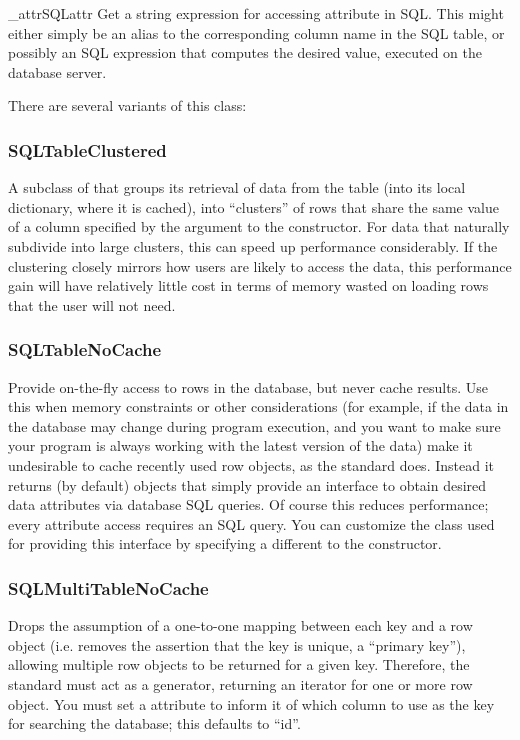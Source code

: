 \documentclass{howto}
\begin{document}
\begin{funcdesc}{_attrSQL}{attr}
  Get a string expression for accessing attribute  in SQL.
  This might either simply be an alias to the corresponding column
  name in the SQL table, or possibly an SQL expression that computes
  the desired value, executed on the database server.
\end{funcdesc}



There are several variants of this class:
\subsubsection{SQLTableClustered}
A subclass of  that groups its retrieval
of data from the table (into its local dictionary, where it
is cached), into ``clusters'' of rows that share the same value of
a column specified by the  argument to the 
constructor.  For data that naturally subdivide into large clusters,
this can speed up performance considerably.  If the clustering
closely mirrors how users are likely to access the data, this
performance gain will have relatively little cost in terms
of memory wasted on loading rows that the user will not need.


\subsubsection{SQLTableNoCache}
Provide on-the-fly access to rows in the database, 
but never cache results.  Use this when memory constraints or other 
considerations (for example, if the data in the database may change
during program execution, and you want to make sure your program
is always working with the latest version of the data) 
make it undesirable to cache recently used row objects, as the
standard  does.  Instead it returns (by default)
 objects that simply provide an interface
to obtain desired data attributes via database SQL queries.
Of course this reduces performance; every attribute access
requires an SQL query.  You can customize the class used for
providing this interface by specifying a different 
to the constructor.

\subsubsection{SQLMultiTableNoCache}
Drops the assumption of a one-to-one
mapping between each key and a row object (i.e. removes the
assertion that the key is unique, a ``primary key''), allowing
multiple row objects to be returned for a given key.  Therefore,
the standard  must act as a generator, returning
an iterator for one or more row object.  You must set a 
 attribute to inform it of which 
column to use as the key for searching the database;
this defaults to ``id''.
\end{document}
